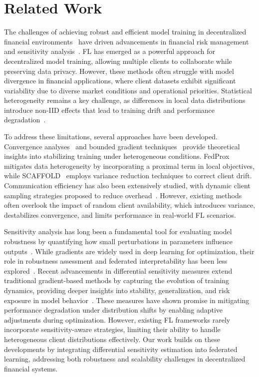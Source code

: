 \section{Related Work}
\label{related}
The challenges of achieving robust and efficient model training in decentralized financial environments~\cite{isichenko2021quantitative, karatzas2021portfolio} have driven advancements in financial risk management and sensitivity analysis~\cite{shang2021capital}. FL has emerged as a powerful approach for decentralized model training, allowing multiple clients to collaborate while preserving data privacy. However, these methods often struggle with model divergence in financial applications, where client datasets exhibit significant variability due to diverse market conditions and operational priorities. Statistical heterogeneity remains a key challenge, as differences in local data distributions introduce non-IID effects that lead to training drift and performance degradation~\cite{zhao2018federated}.


To address these limitations, several approaches have been developed. Convergence analyses~\cite{ khaled2020tighter, yang2021achieving} and bounded gradient techniques~\cite{wang2019adaptive} provide theoretical insights into stabilizing training under heterogeneous conditions. FedProx~\cite{li2020federated} mitigates data heterogeneity by incorporating a proximal term in local objectives, while SCAFFOLD~\cite{karimireddy2020scaffold} employs variance reduction techniques to correct client drift. Communication efficiency has also been extensively studied, with dynamic client sampling strategies proposed to reduce overhead~\cite{gorbunov2021marina, yang2021achieving}. However, existing methods often overlook the impact of random client availability, which introduces variance, destabilizes convergence, and limits performance in real-world FL scenarios.

Sensitivity analysis has long been a fundamental tool for evaluating model robustness by quantifying how small perturbations in parameters influence outputs~\cite{borgonovo2016sensitivity, fissler2023sensitivity}. While gradients are widely used in deep learning for optimization, their role in robustness assessment and federated interpretability has been less explored~\cite{pesenti2024differential}. Recent advancements in differential sensitivity measures extend traditional gradient-based methods by capturing the evolution of training dynamics, providing deeper insights into stability, generalization, and risk exposure in model behavior~\cite{pesenti2021cascade}. These measures have shown promise in mitigating performance degradation under distribution shifts by enabling adaptive adjustments during optimization. However, existing FL frameworks rarely incorporate sensitivity-aware strategies, limiting their ability to handle heterogeneous client distributions effectively. Our work builds on these developments by integrating differential sensitivity estimation into federated learning, addressing both robustness and scalability challenges in decentralized financial systems.


